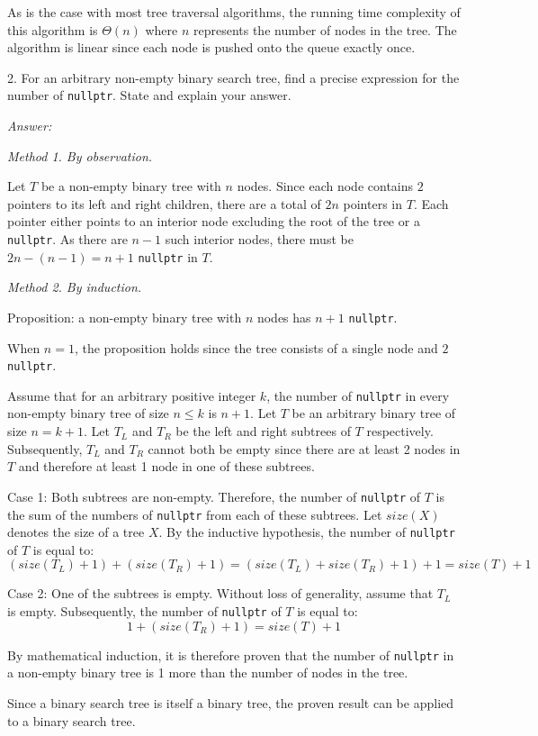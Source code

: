 \documentclass[12pt]{article}
\begin{document}
As is the case with most tree traversal algorithms, the running time complexity of 
this algorithm is $\Theta(n)$ where $n$ represents the number of nodes in the tree. 
The algorithm is linear since each node is pushed onto the queue exactly once.

2. For an arbitrary non-empty binary search tree, find a precise expression for the
number of \texttt{nullptr}. State and explain your answer.

\textit{Answer:}

\textit{Method 1. By observation.}

Let $T$ be a non-empty binary tree with $n$ nodes. Since each node contains $2$ pointers
to its left and right children, there are a total of $2n$ pointers in $T$. Each pointer 
either points to an interior node excluding the root of the tree or a \texttt{nullptr}.
As there are $n - 1$ such interior nodes, there must be $2n - (n - 1) = n + 1$ 
\texttt{nullptr} in $T$.

\textit{Method 2. By induction.}

Proposition: a non-empty binary tree with $n$ nodes has $n + 1$ \texttt{nullptr}. 

When $n = 1$, the proposition holds since the tree consists of a single node and
$2$ \texttt{nullptr}.

Assume that for an arbitrary positive integer $k$, the number of \texttt{nullptr} in
every non-empty binary tree of size $n \leq k$ is $n + 1$. Let $T$ be an arbitrary 
binary tree of size $n = k + 1$. Let $T_L$ and $T_R$ be the left and right subtrees 
of $T$ respectively. Subsequently, $T_L$ and $T_R$ cannot both be empty since there are at
least 2 nodes in $T$ and therefore at least 1 node in one of these subtrees. 

Case 1: Both subtrees are non-empty. Therefore, the number of \texttt{nullptr} of $T$
is the sum of the numbers of \texttt{nullptr} from each of these subtrees. Let $size(X)$ 
denotes the size of a tree $X$. By the inductive hypothesis, the number of \texttt{nullptr}
of $T$ is equal to:
\[
(size(T_L) + 1) + (size(T_R) + 1)
= (size(T_L) + size(T_R) + 1) + 1
= size(T) + 1
\]

Case 2: One of the subtrees is empty. Without loss of generality, assume that $T_L$ is empty.
Subsequently, the number of \texttt{nullptr} of $T$ is equal to:
\[
1 + (size(T_R) + 1)
= size(T) + 1
\]

By mathematical induction, it is therefore proven that the number of \texttt{nullptr} in a 
non-empty binary tree is 1 more than the number of nodes in the tree.

Since a binary search tree is itself a binary tree, the proven result can be applied to a
binary search tree.
\end{document}
